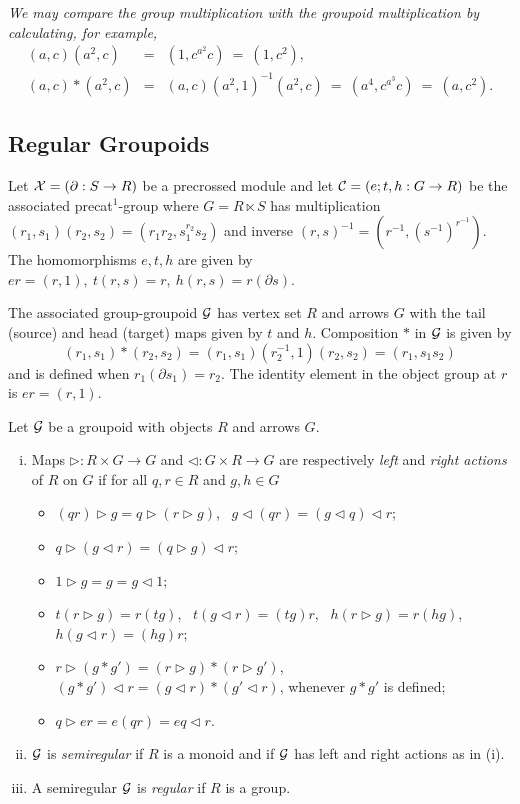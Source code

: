 \begin{example}
\noindent
\emph{We may compare the group multiplication with the groupoid multiplication
by calculating, for example,}
\begin{eqnarray*}
(a,c)(a^2,c) &=& (1,c^{a^2}c) ~=~ (1,c^2), \\
(a,c)*(a^2,c)     &=& (a,c)(a^2,1)^{-1}(a^2,c) ~=~ (a^4,c^{a^3}c) ~=~ (a,c^2).
\end{eqnarray*}
\end{example}


\newpage
\subsection{Regular Groupoids} \label{subs:reggpd}  

Let $\mathcal{X} = (\partial : S \to R)$ be a precrossed module and let 
$\mathcal{C} = (e;t,h : G \to R)$ be the associated precat$^1$-group 
where $G = R \ltimes S$ 
has multiplication $(r_1,s_1)(r_2,s_2) = (r_1r_2,s_1^{r_2}s_2)$ 
and inverse $(r,s)^{-1} = (r^{-1},(s^{-1})^{r^{-1}})$. 
The homomorphisms $e,t,h$ are given by 
$er = (r,1),~ t(r,s) = r,~ h(r,s) = r(\partial s)$. 

The associated group-groupoid $\mathcal{G}$ has vertex set $R$ and arrows $G$ 
with the tail (source) and head (target) maps given by $t$ and $h$. 
Composition $*$ in $\mathcal{G}$ is given by 
$$
(r_1,s_1) * (r_2,s_2) = (r_1,s_1)(r_2^{-1},1)(r_2,s_2) = (r_1,s_1s_2) 
$$ 
and is defined when $r_1(\partial s_1) = r_2$. 
The identity element in the object group at $r$ is $er = (r,1)$. 

\begin{defn} \label{defn:left-right-action}
Let $\mathcal{G}$ be a groupoid with objects $R$ and arrows $G$. 
\begin{enumerate}[(i)]
\item
Maps $\rhd : R \times G \to G$ and $\lhd : G \times R \to G$ 
are respectively \emph{left} and \emph{right actions} of $R$ on $G$ 
if for all $q,r \in R$ and $g,h \in G$ 
\begin{itemize} 
\item 
$(qr) \rhd g = q \rhd (r \rhd g)$,~ $g \lhd (qr) = (g \lhd q) \lhd r$; 
\item
$q \rhd (g \lhd r) = (q \rhd g) \lhd r$; 
\item
$1 \rhd g = g = g \lhd 1$; 
\item
$t(r \rhd g) = r(tg)$,~ $t(g \lhd r) = (tg)r$,~ 
$h(r \rhd g) = r(hg)$,~ $h(g \lhd r) = (hg)r$; 
\item 
$r \rhd (g * g') = (r \rhd g) * (r \rhd g')$,~ 
$(g * g') \lhd r = (g \lhd r) * (g' \lhd r)$, 
whenever $g * g'$ is defined; 
\item 
$q \rhd er = e(qr) = eq \lhd r$. 
\end{itemize}
\item 
$\mathcal{G}$ is \emph{semiregular} if $R$ is a monoid 
and if $\mathcal{G}$ has left and right actions as in (i). 
\item
A semiregular $\mathcal{G}$ is \emph{regular} if $R$ is a group. 
\end{enumerate}
\end{defn}

